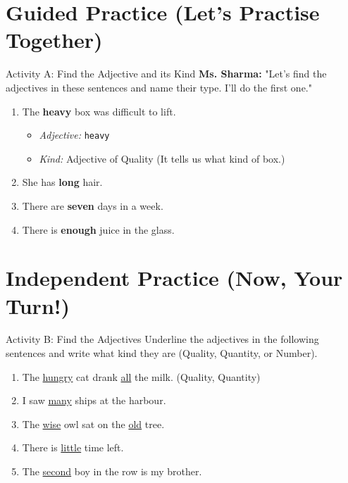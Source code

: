 \section{Guided Practice (Let's Practise Together)}
\begin{activitybox}{Activity A: Find the Adjective and its Kind}
\textbf{Ms. Sharma:} "Let's find the adjectives in these sentences and name their type. I'll do the first one."
\begin{enumerate}
    \item The \textbf{heavy} box was difficult to lift.
    \begin{itemize}
        \item \textit{Adjective:} \texttt{heavy}
        \item \textit{Kind:} Adjective of Quality (It tells us what kind of box.)
    \end{itemize}
    \item She has \textbf{long} hair.
    \item There are \textbf{seven} days in a week.
    \item There is \textbf{enough} juice in the glass.
\end{enumerate}
\end{activitybox}

\section{Independent Practice (Now, Your Turn!)}
\begin{activitybox}{Activity B: Find the Adjectives}
Underline the adjectives in the following sentences and write what kind they are (Quality, Quantity, or Number).
\begin{enumerate}
    \item The \underline{hungry} cat drank \underline{all} the milk. (Quality, Quantity)
    \item I saw \underline{many} ships at the harbour.
    \item The \underline{wise} owl sat on the \underline{old} tree.
    \item There is \underline{little} time left.
    \item The \underline{second} boy in the row is my brother.
\end{enumerate}
\end{activitybox}

